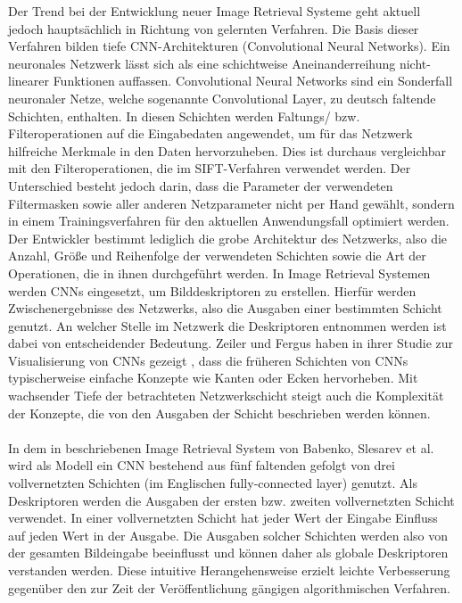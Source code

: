 Der Trend bei der Entwicklung neuer Image Retrieval Systeme geht aktuell jedoch hauptsächlich in Richtung von gelernten Verfahren. Die Basis dieser Verfahren bilden tiefe CNN-Architekturen (Convolutional Neural Networks). Ein neuronales Netzwerk lässt sich als eine schichtweise Aneinanderreihung nicht-linearer Funktionen auffassen. Convolutional Neural Networks sind ein Sonderfall neuronaler Netze, welche sogenannte Convolutional Layer, zu deutsch faltende Schichten, enthalten. In diesen Schichten werden Faltungs/ bzw. Filteroperationen auf die Eingabedaten angewendet, um für das Netzwerk hilfreiche Merkmale in den Daten hervorzuheben. Dies ist durchaus vergleichbar mit den Filteroperationen, die im SIFT-Verfahren verwendet werden. Der Unterschied besteht jedoch darin, dass die Parameter der verwendeten Filtermasken sowie aller anderen Netzparameter nicht per Hand gewählt, sondern in einem Trainingsverfahren für den aktuellen Anwendungsfall optimiert werden. Der Entwickler bestimmt lediglich die grobe Architektur des Netzwerks, also die Anzahl, Größe und Reihenfolge der verwendeten Schichten sowie die Art der Operationen, die in ihnen durchgeführt werden. In Image Retrieval Systemen werden CNNs eingesetzt, um Bilddeskriptoren zu erstellen. Hierfür werden Zwischenergebnisse des Netzwerks, also die Ausgaben einer bestimmten Schicht genutzt. An welcher Stelle im Netzwerk die Deskriptoren entnommen werden ist dabei von entscheidender Bedeutung. Zeiler und Fergus haben in ihrer Studie zur Visualisierung von CNNs gezeigt \cite{extraction_point_meaning}, dass die früheren Schichten von CNNs typischerweise einfache Konzepte wie Kanten oder Ecken hervorheben. Mit wachsender Tiefe der betrachteten Netzwerkschicht steigt auch die Komplexität der Konzepte, die von den Ausgaben der Schicht beschrieben werden können.
\\\\
In dem in \cite{fc_extraction_neural_codes} beschriebenen Image Retrieval System von Babenko, Slesarev et al. wird als Modell ein CNN bestehend aus fünf faltenden gefolgt von drei vollvernetzten Schichten (im Englischen fully-connected layer) genutzt. Als Deskriptoren werden die Ausgaben der ersten bzw. zweiten vollvernetzten Schicht verwendet. In einer vollvernetzten Schicht hat jeder Wert der Eingabe Einfluss auf jeden Wert in der Ausgabe. Die Ausgaben solcher Schichten werden also von der gesamten Bildeingabe beeinflusst und können daher als globale Deskriptoren verstanden werden. Diese intuitive Herangehensweise erzielt leichte Verbesserung gegenüber den zur Zeit der Veröffentlichung gängigen algorithmischen Verfahren.
